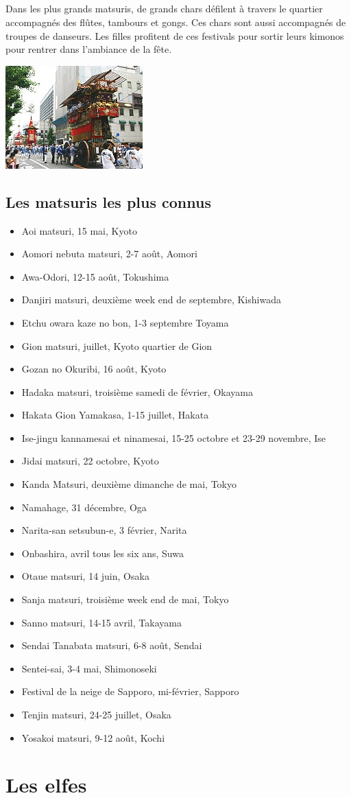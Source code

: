 \paragraph{}
Dans les plus grands matsuris, de grands chars défilent à travers le quartier accompagnés des flûtes, tambours et gongs. Ces chars sont aussi accompagnés de troupes de danseurs. Les filles profitent de ces festivals pour sortir leurs kimonos pour rentrer dans l’ambiance de la fête.
\begin{center}
\includegraphics[scale=1.3]{gion.jpg}
\end{center}
\newpage
\section{Les matsuris les plus connus}
\begin{itemize}
\item Aoi matsuri, 15 mai, Kyoto
\item Aomori nebuta matsuri, 2-7 août, Aomori
\item Awa-Odori, 12-15 août, Tokushima
\item Danjiri matsuri, deuxième week end de septembre, Kishiwada
\item Etchu owara kaze no bon, 1-3 septembre Toyama
\item Gion matsuri, juillet, Kyoto quartier de Gion
\item Gozan no Okuribi, 16 août, Kyoto
\item Hadaka matsuri, troisième samedi de février, Okayama
\item Hakata Gion Yamakasa, 1-15 juillet, Hakata
\item Ise-jingu kannamesai et ninamesai, 15-25 octobre et 23-29 novembre, Ise
\item Jidai matsuri, 22 octobre, Kyoto
\item Kanda Matsuri, deuxième dimanche de mai, Tokyo
\item Namahage, 31 décembre, Oga
\item Narita-san setsubun-e, 3 février, Narita
\item Onbashira, avril tous les six ans, Suwa
\item Otaue matsuri, 14 juin, Osaka
\item Sanja matsuri, troisième week end de mai, Tokyo
\item Sanno matsuri, 14-15 avril, Takayama
\item Sendai Tanabata matsuri, 6-8 août, Sendai
\item Sentei-sai, 3-4 mai, Shimonoseki
\item Festival de la neige de Sapporo, mi-février, Sapporo
\item Tenjin matsuri, 24-25 juillet, Osaka
\item Yosakoi matsuri, 9-12 août, Kochi
\end{itemize}

\chapter{Les elfes}